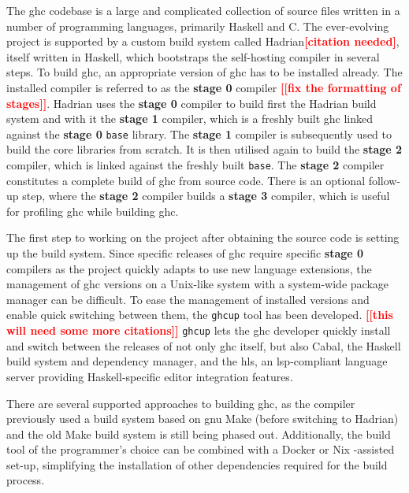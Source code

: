 \documentclass[thesis=B,english]{FITthesis}[2019/12/23]
\newcommand{\todo}[1]{\textcolor{red}{\textbf{[[#1]]}}}
\newcommand{\citationNeeded}{\textcolor{red}{\textbf{[citation needed]}}}
\newcommand{\hackage}[1]{\texttt{#1}}
\begin{document}
The \acrshort{ghc} codebase is a large and complicated collection of source
files written in a number of programming languages, primarily Haskell and
C\cite{arch-ghc}. The ever-evolving project is supported by a custom build
system called Hadrian\citationNeeded, itself written in Haskell, which
bootstraps the self-hosting compiler in several steps. To build \acrshort{ghc},
an appropriate version of \acrshort{ghc} has to be installed already. The
installed compiler is referred to as the \textbf{stage 0} compiler \todo{fix
the formatting of stages}. Hadrian uses the \textbf{stage 0} compiler to build
first the Hadrian build system and with it the \textbf{stage 1} compiler, which
is a freshly built \acrshort{ghc} linked against the \textbf{stage 0}
\hackage{base} library. The \textbf{stage 1} compiler is subsequently used to
build the core libraries from scratch. It is then utilised again to build the
\textbf{stage 2} compiler, which is linked against the freshly built
\hackage{base}. The \textbf{stage 2} compiler constitutes a complete build of
\acrshort{ghc} from source code. There is an optional follow-up step, where the
\textbf{stage 2} compiler builds a \textbf{stage 3} compiler, which is useful
for profiling \acrshort{ghc} while building \acrshort{ghc}.

The first step to working on the project after obtaining the source code is
setting up the build system. Since specific releases of \acrshort{ghc} require
specific \textbf{stage 0} compilers as the project quickly adapts to use new
language extensions, the management of \acrshort{ghc} versions on a Unix-like
system with a system-wide package manager can be difficult. To ease the
management of installed versions and enable quick switching between them, the
\texttt{ghcup} tool\cite{ghcup} has been developed. \todo{this will need some
more citations} \texttt{ghcup} lets the \acrshort{ghc} developer quickly
install and switch between the releases of not only \acrshort{ghc} itself, but
also Cabal, the Haskell build system and dependency manager, and the
\acrfull{hls}, an \acrshort{lsp}-compliant language server providing
Haskell-specific editor integration features.

There are several supported approaches to building \acrshort{ghc}, as the
compiler previously used a build system based on \acrshort{gnu} Make (before
switching to Hadrian) and the old Make build system is still being phased out.
Additionally, the build tool of the programmer's choice can be combined with a
Docker or Nix -assisted set-up, simplifying the installation of other
dependencies required for the build process.
\end{document}
